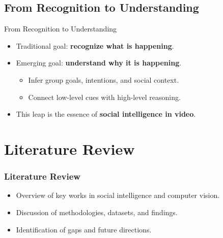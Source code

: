 \documentclass{beamer}
\begin{document}
\subsection{From Recognition to Understanding}
\begin{frame}{From Recognition to Understanding}
    \begin{itemize}
        \item Traditional goal: \textbf{recognize what is happening}.
        \item Emerging goal: \textbf{understand why it is happening}.
              \begin{itemize}
                  \item Infer group goals, intentions, and social context.
                  \item Connect low-level cues with high-level reasoning.
              \end{itemize}
        \item This leap is the essence of \textbf{social intelligence in video}.
    \end{itemize}
\end{frame}

\section{Literature Review}
\begin{frame}
    \frametitle{Literature Review}
    \begin{itemize}
        \item Overview of key works in social intelligence and computer vision.
        \item Discussion of methodologies, datasets, and findings.
        \item Identification of gaps and future directions.
    \end{itemize}
\end{frame}
\end{document}
